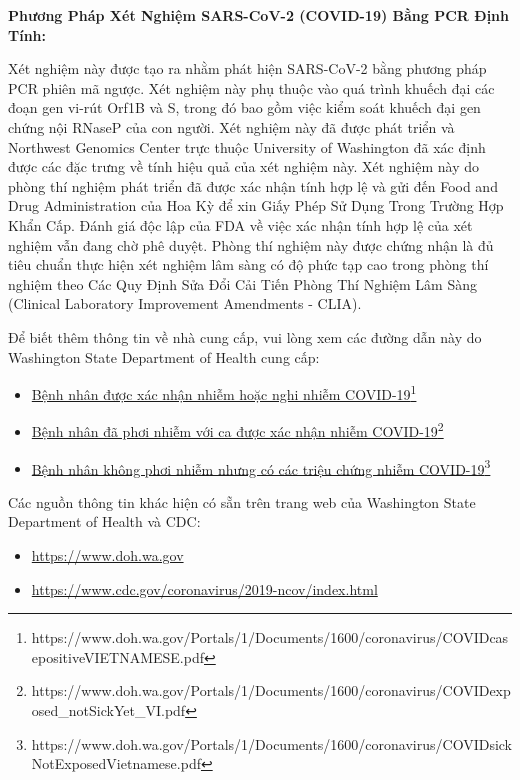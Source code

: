 \documentclass[10pt]{article}
\newcommand{\link}[2]{\href{#1}{#2}\footnote{#1}}
\begin{document}
\bigskip
\textbf{Phương Pháp Xét Nghiệm SARS-CoV-2 (COVID-19) Bằng PCR Định Tính:}

Xét nghiệm này được tạo ra nhằm phát hiện SARS-CoV-2 bằng phương pháp PCR phiên
mã ngược. Xét nghiệm này phụ thuộc vào quá trình khuếch đại các đoạn gen vi-rút
Orf1B và S, trong đó bao gồm việc kiểm soát khuếch đại gen chứng nội RNaseP của
con người. Xét nghiệm này đã được phát triển và Northwest Genomics Center trực
thuộc University of Washington đã xác định được các đặc trưng về tính hiệu quả
của xét nghiệm này. Xét nghiệm này do phòng thí nghiệm phát triển đã được xác
nhận tính hợp lệ và gửi đến Food and Drug Administration của Hoa Kỳ để xin Giấy
Phép Sử Dụng Trong Trường Hợp Khẩn Cấp. Đánh giá độc lập của FDA về việc xác
nhận tính hợp lệ của xét nghiệm vẫn đang chờ phê duyệt. Phòng thí nghiệm này
được chứng nhận là đủ tiêu chuẩn thực hiện xét nghiệm lâm sàng có độ phức tạp
cao trong phòng thí nghiệm theo Các Quy Định Sửa Đổi Cải Tiến Phòng Thí Nghiệm
Lâm Sàng (Clinical Laboratory Improvement Amendments - CLIA).

Để biết thêm thông tin về nhà cung cấp, vui lòng xem các đường dẫn này do
Washington State Department of Health cung cấp:

\begin{itemize}
\item

  \link{https://www.doh.wa.gov/Portals/1/Documents/1600/coronavirus/COVIDcasepositiveVIETNAMESE.pdf}{Bệnh
  nhân được xác nhận nhiễm hoặc nghi nhiễm COVID-19}

\item

  \link{https://www.doh.wa.gov/Portals/1/Documents/1600/coronavirus/COVIDexposed\_notSickYet\_VI.pdf}{Bệnh
  nhân đã phơi nhiễm với ca được xác nhận nhiễm COVID-19}

\item

  \link{https://www.doh.wa.gov/Portals/1/Documents/1600/coronavirus/COVIDsickNotExposedVietnamese.pdf}{Bệnh
  nhân không phơi nhiễm nhưng có các triệu chứng nhiễm COVID-19}

\end{itemize}

Các nguồn thông tin khác hiện có sẵn trên trang web của Washington State
Department of Health và CDC:

\begin{itemize}
\item

  \url{https://www.doh.wa.gov}

\item

  \url{https://www.cdc.gov/coronavirus/2019-ncov/index.html}

\end{itemize}
\end{document}
